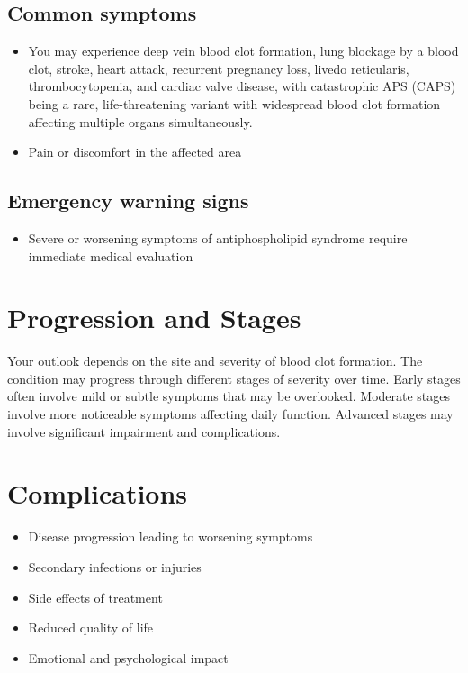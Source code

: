 \subsection{Common symptoms}
\begin{itemize}[noitemsep]
  \item You may experience deep vein blood clot formation, lung blockage by a blood clot, stroke, heart attack, recurrent pregnancy loss, livedo reticularis, thrombocytopenia, and cardiac valve disease, with catastrophic APS (CAPS) being a rare, life-threatening variant with widespread blood clot formation affecting multiple organs simultaneously.

  \item Pain or discomfort in the affected area
  \end{itemize}

\subsection{Emergency warning signs}
\begin{itemize}[noitemsep]
  \item Severe or worsening symptoms of antiphospholipid syndrome require immediate medical evaluation
\end{itemize}
\section{Progression and Stages}
Your outlook depends on the site and severity of blood clot formation. The condition may progress through different stages of severity over time. Early stages often involve mild or subtle symptoms that may be overlooked. Moderate stages involve more noticeable symptoms affecting daily function. Advanced stages may involve significant impairment and complications.
\section{Complications}
\begin{itemize}[noitemsep]
  \item Disease progression leading to worsening symptoms
  \item Secondary infections or injuries
  \item Side effects of treatment
  \item Reduced quality of life
  \item Emotional and psychological impact
\end{itemize}
